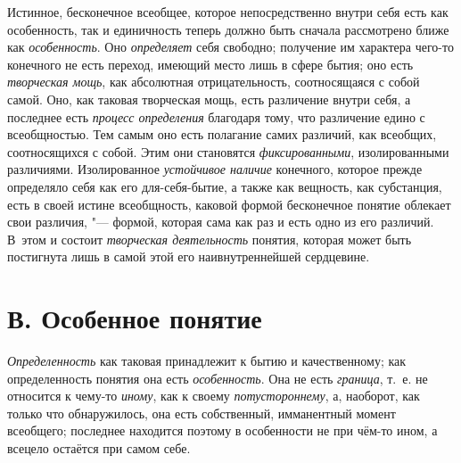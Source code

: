 Истинное, бесконечное всеобщее, которое непосредственно внутри
себя есть как особенность, так и единичность теперь должно быть сначала
рассмотрено ближе как
{\em особенность}. Оно
{\em определяет} себя
свободно; получение им характера чего-то конечного не есть переход, имеющий
место лишь в сфере бытия; оно есть
{\em творческая мощь},
как абсолютная отрицательность, соотносящаяся с собой самой.
Оно, как таковая творческая мощь, есть различение внутри себя, а последнее
есть {\em процесс определения}
благодаря тому, что различение едино с всеобщностью. Тем
самым оно есть полагание самих различий, как всеобщих, соотносящихся с
собой. Этим они становятся
{\em фиксированными},
изолированными различиями. Изолированное
{\em устойчивое наличие}
конечного, которое прежде определяло себя как его
для-себя-бытие, а также как вещность, как субстанция, есть в своей истине
всеобщность, каковой формой бесконечное понятие облекает свои различия, "---
формой, которая сама как раз и есть одно из его различий.
В~этом и состоит {\em творческая
деятельность} понятия, которая может быть постигнута лишь в
самой этой его наивнутреннейшей сердцевине.

\section[В. Особенное понятие]{В. Особенное понятие}
{\em Определенность} как
таковая принадлежит к бытию и качественному; как определенность понятия она
есть {\em особенность}.
Она не есть
{\em граница}, т.~е. не
относится к чему-то {\em иному},
как к своему
{\em потустороннему}, а,
наоборот, как только что обнаружилось, она есть собственный, имманентный
момент всеобщего; последнее находится поэтому в особенности не
при чём-то ином, а всецело остаётся при самом себе.


